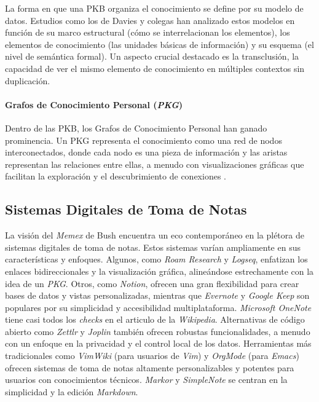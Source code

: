 La forma en que una PKB organiza el conocimiento se define por su modelo de datos. Estudios como los de Davies y colegas \parencite{daviesBuildingMemexSixty2005, daviesStillBuildingMemex2011} han analizado estos modelos en función de su marco estructural (cómo se interrelacionan los elementos), los elementos de conocimiento (las unidades básicas de información) y su esquema (el nivel de semántica formal). Un aspecto crucial destacado es la transclusión, la capacidad de ver el mismo elemento de conocimiento en múltiples contextos sin duplicación.

\paragraph{Grafos de Conocimiento Personal (\textit{PKG})}
Dentro de las PKB, los Grafos de Conocimiento Personal han ganado prominencia. Un PKG representa el conocimiento como una red de nodos interconectados, donde cada nodo es una pieza de información y las aristas representan las relaciones entre ellas, a menudo con visualizaciones gráficas que facilitan la exploración y el descubrimiento de conexiones \parencite{pyneMetaworkHowWe2022}.

\subsection{Sistemas Digitales de Toma de Notas}
\label{subsec:sistemas_digitales_toma_notas}
La visión del \textit{Memex} de Bush encuentra un eco contemporáneo en la plétora de sistemas digitales de toma de notas. Estos sistemas varían ampliamente en sus características y enfoques. Algunos, como \textit{Roam Research} y \textit{Logseq}, enfatizan los enlaces bidireccionales y la visualización gráfica, alineándose estrechamente con la idea de un \textit{PKG}. Otros, como \textit{Notion}, ofrecen una gran flexibilidad para crear bases de datos y vistas personalizadas, mientras que \textit{Evernote} y \textit{Google Keep} son populares por su simplicidad y accesibilidad multiplataforma. \textit{Microsoft OneNote} tiene casi todos los \textit{checks} en el articulo de la \textit{Wikipedia}. Alternativas de código abierto como \textit{Zettlr} y \textit{Joplin} también ofrecen robustas funcionalidades, a menudo con un enfoque en la privacidad y el control local de los datos. Herramientas más tradicionales como \textit{VimWiki} (para usuarios de \textit{Vim}) y \textit{OrgMode} (para \textit{Emacs}) ofrecen sistemas de toma de notas altamente personalizables y potentes para usuarios con conocimientos técnicos. \textit{Markor} y \textit{SimpleNote} se centran en la simplicidad y la edición \textit{Markdown}.

